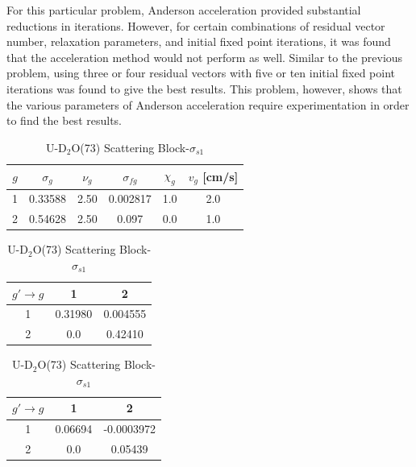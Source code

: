 For this particular problem, Anderson acceleration provided substantial reductions in iterations. However, for certain combinations of residual vector number, relaxation parameters, and initial fixed point iterations, it was found that the acceleration method would not perform as well. Similar to the previous problem, using three or four residual vectors with five or ten initial fixed point iterations was found to give the best results. This problem, however, shows that the various parameters of Anderson acceleration require experimentation in order to find the best results.

\begin{table}[!htbp]
	\caption{Two-Group U-D$_{2}$O Problem Cross Sections (cm$^{-1}$)}
	\label{table:D2O-Sood73}
	\begin{subtable}[!htbp]{1.0\textwidth}
		\centering{}
		\begin{tabular}{@{}cccccc@{}}\toprule
			$g$ & $\sigma_{g} $ & $\nu_{g}$ & $\sigma_{fg}$ & $\chi_{g}$ & $v_{g}$ [cm/s] \\ 
        			\midrule
			1 & 0.33588  & 2.50 & 0.002817 & 1.0 & 2.0 \\
			2 & 0.54628  & 2.50 & 0.097 & 0.0 & 1.0 \\
			\bottomrule
		\end{tabular}
	\caption{U-D$_{2}$O(73) Cross Sections}
	\end{subtable}%
	\vspace{0.25cm}
	\begin{subtable}[!htbp]{1.0\textwidth}
	\centering{}
	\begin{tabular}{@{}ccc@{}}\toprule
	$g' \rightarrow g$ & 1 & 2 \\ 
        \midrule
	1 & 0.31980 & 0.004555   \\
	2 & 0.0 & 0.42410  \\
	\bottomrule
	\end{tabular}
	\caption{U-D$_{2}$O(73) Scattering Block-$\sigma_{s0}$}
	\end{subtable}
		\begin{subtable}[!htbp]{1.0\textwidth}
	\centering{}
	\begin{tabular}{@{}ccc@{}}\toprule
	$g' \rightarrow g$ & 1 & 2 \\ 
        \midrule
	1 & 0.06694 & -0.0003972 \\
	2 & 0.0 & 0.05439  \\
	\bottomrule
	\end{tabular}
	\caption{U-D$_{2}$O(73) Scattering Block-$\sigma_{s1}$}
	\end{subtable}
\end{table}

